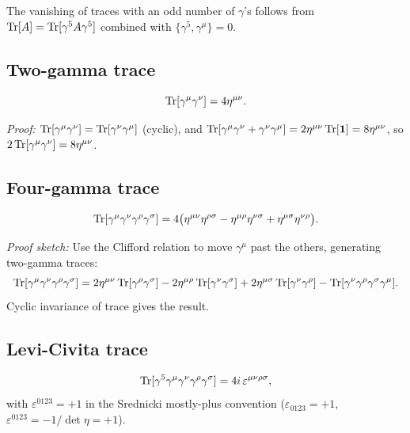 The vanishing of traces with an odd number of $\gamma$'s follows from
$\operatorname{Tr}[A] = \operatorname{Tr}[\gamma^5 A \gamma^5]$ combined with $\{\gamma^5,\gamma^\mu\}=0$.

\subsection{Two-gamma trace}

\begin{mdframed}[backgroundcolor=blue!5]
\begin{equation}\label{eq:tr2}
  \operatorname{Tr}[\gamma^\mu\gamma^\nu] = 4\eta^{\mu\nu}.
\end{equation}
\end{mdframed}

\textit{Proof:} $\operatorname{Tr}[\gamma^\mu\gamma^\nu] = \operatorname{Tr}[\gamma^\nu\gamma^\mu]$ (cyclic),
and $\operatorname{Tr}[\gamma^\mu\gamma^\nu+\gamma^\nu\gamma^\mu] = 2\eta^{\mu\nu}\operatorname{Tr}[\mathbf{1}] = 8\eta^{\mu\nu}$,
so $2\operatorname{Tr}[\gamma^\mu\gamma^\nu] = 8\eta^{\mu\nu}$.

\subsection{Four-gamma trace}

\begin{mdframed}[backgroundcolor=blue!5]
\begin{equation}\label{eq:tr4}
  \operatorname{Tr}[\gamma^\mu\gamma^\nu\gamma^\rho\gamma^\sigma]
  = 4\bigl(\eta^{\mu\nu}\eta^{\rho\sigma}
           - \eta^{\mu\rho}\eta^{\nu\sigma}
           + \eta^{\mu\sigma}\eta^{\nu\rho}\bigr).
\end{equation}
\end{mdframed}

\textit{Proof sketch:} Use the Clifford relation to move $\gamma^\mu$ past the others,
generating two-gamma traces:
\[
  \operatorname{Tr}[\gamma^\mu\gamma^\nu\gamma^\rho\gamma^\sigma]
  = 2\eta^{\mu\nu}\operatorname{Tr}[\gamma^\rho\gamma^\sigma]
  - 2\eta^{\mu\rho}\operatorname{Tr}[\gamma^\nu\gamma^\sigma]
  + 2\eta^{\mu\sigma}\operatorname{Tr}[\gamma^\nu\gamma^\rho]
  - \operatorname{Tr}[\gamma^\nu\gamma^\rho\gamma^\sigma\gamma^\mu].
\]
Cyclic invariance of trace gives the result.

\subsection{Levi-Civita trace}

\begin{mdframed}[backgroundcolor=blue!5]
\begin{equation}\label{eq:tr4g5}
  \operatorname{Tr}[\gamma^5\gamma^\mu\gamma^\nu\gamma^\rho\gamma^\sigma]
  = 4i\,\varepsilon^{\mu\nu\rho\sigma},
\end{equation}
with $\varepsilon^{0123} = +1$ in the Srednicki mostly-plus convention
($\varepsilon_{0123} = +1$, $\varepsilon^{0123} = -1/\det\eta = +1$).
\end{mdframed}

